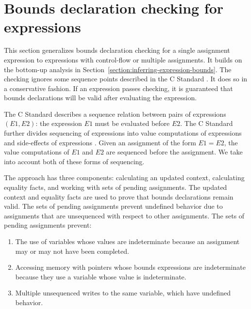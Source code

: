 \section{Bounds declaration checking for expressions}

\label{section:checking-assignment-expressions}
\label{section:checking-nested-assignment-expressions}

This section generalizes bounds declaration checking for a single
assignment expression to expressions with control-flow or multiple
assignments.
It builds on the bottom-up analysis in
Section~\ref{section:inferring-expression-bounds}.  The
checking ignores some sequence points described in the C Standard \cite{ISO2011}.
It does so in a conservative fashion.
If an expression passes checking, it is guaranteed that bounds 
declarations will be valid after evaluating the expression.

The C Standard \cite[Section 5.1.2.3]{ISO2011}
describes a sequence relation between pairs of expressions $(E1, E2)$:
the expression $E1$ must be evaluated before $E2$.  
The C Standard
further divides sequencing of expressions into value computations
of expressions and side-effects of expressions \cite[Section 6.5, pars. 1,2]{ISO2011}.
Given an assignment of the form $E1 = E2$, 
the value computations of $E1$ and $E2$ are sequenced before the
assignment. We take into account both of these forms of sequencing.

The approach has three components: calculating an updated context,
calculating equality facts, and working with sets of pending assignments.
The updated context and equality facts are used to prove that bounds
declarations remain valid.  The sets of pending assignments prevent 
undefined behavior due to assignments that are unsequenced with respect
to other assignments.   The sets of pending assignments prevent:
\begin{enumerate}
\item The use of variables whose values are
indeterminate because an assignment may or may not have been completed.
\item Accessing memory with pointers whose bounds expressions
are indeterminate because they use a variable whose value is indeterminate.
\item Multiple unsequenced writes to the  same variable, which have undefined behavior.
\end{enumerate}

